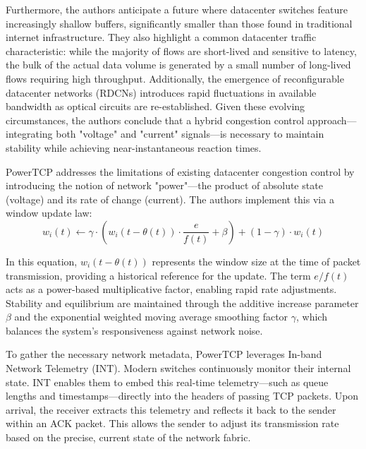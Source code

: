 Furthermore, the authors anticipate a future where datacenter switches feature increasingly shallow buffers, significantly smaller than those found in traditional internet infrastructure\cite{PowerTCP}. 
They also highlight a common datacenter traffic characteristic: while the majority of flows are short-lived and sensitive to latency, the bulk of the actual data volume is generated by a small number of long-lived flows requiring high throughput\cite{PowerTCP}. 
Additionally, the emergence of reconfigurable datacenter networks (RDCNs) introduces rapid fluctuations in available bandwidth as optical circuits are re-established\cite{PowerTCP}. 
Given these evolving circumstances, the authors conclude that a hybrid congestion control approach—integrating both "voltage" and "current" signals—is necessary to maintain stability while achieving near-instantaneous reaction times\cite{PowerTCP}.

PowerTCP addresses the limitations of existing datacenter congestion control by introducing the notion of network "power"—the product of absolute state (voltage) and its rate of change (current)\cite{PowerTCP}. 
The authors implement this via a window update law:
\begin{equation} \label{eq:PowerEquation1}
    w_i(t) \leftarrow \gamma \cdot (w_i(t - \theta(t)) \cdot \frac{e}{f(t)} + \beta) + (1 - \gamma) \cdot w_i(t)
\end{equation}

In this equation, $w_i(t - \theta(t))$ represents the window size at the time of packet transmission, providing a historical reference for the update\cite{PowerTCP}. 
The term $e/f(t)$ acts as a power-based multiplicative factor, enabling rapid rate adjustments\cite{PowerTCP}. 
Stability and equilibrium are maintained through the additive increase parameter $\beta$ and the exponential weighted moving average smoothing factor $\gamma$, which balances the system's responsiveness against network noise\cite{PowerTCP}.

To gather the necessary network metadata, PowerTCP leverages In-band Network Telemetry (INT)\cite{PowerTCP}. 
Modern switches continuously monitor their internal state\cite{PowerTCP}.
INT enables them to embed this real-time telemetry—such as queue lengths and timestamps—directly into the headers of passing TCP packets\cite{PowerTCP}. 
Upon arrival, the receiver extracts this telemetry and reflects it back to the sender within an ACK packet. 
This allows the sender to adjust its transmission rate based on the precise, current state of the network fabric\cite{PowerTCP}.

